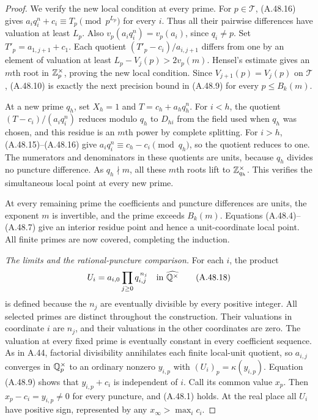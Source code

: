 \begin{proof}
We verify the new local condition at every prime.
For $p\in\mathcal T$, (A.48.16) gives
$a_iq_i^n+c_i\equiv T_p\pmod {p^{L_p}}$
for every $i$. Thus all their pairwise
differences have valuation at least $L_p$.
Also $v_p(a_iq_i^n)=v_p(a_i)$, since $q_i\ne p$.
Set $T'_p=a_{1,j+1}+c_1$. Each quotient
$(T'_p-c_i)/a_{i,j+1}$ differs from one by
an element of valuation at least
$L_p-V_j(p)>2v_p(m)$. Hensel's estimate gives
an $m$th root in $\mathbb Z_p^\times$, proving the
new local condition. Since $V_{j+1}(p)=V_j(p)$
on $\mathcal T$, (A.48.10) is exactly the next
precision bound in (A.48.9) for every
$p\le B_k(m)$.

At a new prime $q_h$, set $X_h=1$ and
$T=c_h+a_hq_h^n$. For $i<h$, the quotient
$(T-c_i)/(a_iq_i^n)$ reduces modulo $q_h$
to $D_{hi}$ from the field used when $q_h$
was chosen, and this residue is an $m$th
power by complete splitting. For $i>h$,
(A.48.15)--(A.48.16) give
$a_iq_i^n\equiv c_h-c_i\pmod {q_h}$,
so the quotient reduces to one. The numerators
and denominators in these quotients are units,
because $q_h$ divides no puncture difference.
As $q_h\nmid m$, all these $m$th roots lift
to $\mathbb Z_{q_h}^\times$. This verifies the
simultaneous local point at every new prime.

At every remaining prime the coefficients and
puncture differences are units, the exponent
$m$ is invertible, and the prime exceeds
$B_k(m)$. Equations (A.48.4)--(A.48.7)
give an interior residue point and hence a
unit-coordinate local point. All finite
primes are now covered, completing the induction.

\emph{The limits and the rational-puncture comparison.}
For each $i$, the product
\[
                  U_i=a_{i,0}
                         \prod_{j\ge0}q_{i,j}^{\,n_j}
                     \quad\text{in }\widehat{\mathbb Q^\times}
 \tag{A.48.18}
\]
is defined because the $n_j$ are eventually
divisible by every positive integer. All selected
primes are distinct throughout the construction.
Their valuations in coordinate $i$ are $n_j$,
and their valuations in the other coordinates
are zero. The valuation at every fixed prime
is eventually constant in every coefficient
sequence. As in A.44, factorial divisibility
annihilates each finite local-unit quotient,
so $a_{i,j}$ converges in $\mathbb Q_p^\times$ to
an ordinary nonzero $y_{i,p}$ with
$(U_i)_p=\kappa(y_{i,p})$.
Equation (A.48.9) shows that
$y_{i,p}+c_i$ is independent of $i$.
Call its common value $x_p$. Then
$x_p-c_i=y_{i,p}\ne0$ for every puncture,
and (A.48.1) holds. At the real place all
$U_i$ have positive sign, represented by
any $x_\infty>\max_i c_i$.


\end{proof}
